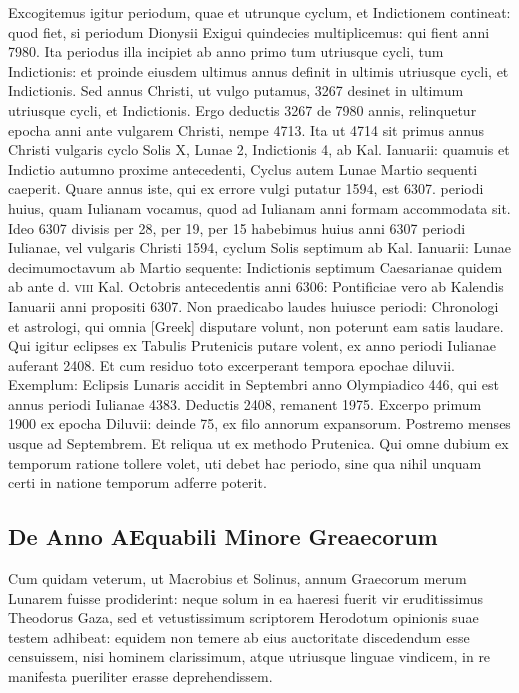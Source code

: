 Excogitemus igitur periodum,
quae et utrunque cyclum, et Indictionem contineat: quod fiet, si periodum
Dionysii Exigui quindecies multiplicemus: qui fient anni
7980.
Ita periodus illa incipiet ab anno primo tum utriusque cycli,
tum Indictionis: et proinde eiusdem ultimus annus definit in ultimis
utriusque cycli, et Indictionis.
Sed annus Christi, ut vulgo putamus,
3267 desinet in ultimum utriusque cycli, et Indictionis.
Ergo deductis
3267 de 7980 annis, relinquetur epocha anni ante vulgarem
Christi, nempe 4713.
Ita ut 4714 sit primus annus Christi vulgaris cyclo
Solis \textsc{X}, Lunae 2, Indictionis 4, ab Kal. Ianuarii: quamuis et Indictio
autumno proxime antecedenti, Cyclus autem Lunae Martio sequenti
caeperit.
Quare annus iste, qui ex errore vulgi putatur 1594, est 6307.
periodi huius, quam Iulianam vocamus, quod ad Iulianam anni formam
accommodata sit.
Ideo 6307 divisis per 28, per 19, per 15 habebimus
huius anni 6307 periodi Iulianae, vel vulgaris Christi 1594, cyclum
Solis septimum ab Kal. Ianuarii: Lunae decimumoctavum ab
Martio sequente: Indictionis septimum Caesarianae quidem ab ante d.
\textsc{viii} Kal. Octobris antecedentis anni 6306: Pontificiae vero ab
Kalendis Ianuarii anni propositi 6307.
Non praedicabo laudes huiusce periodi:
Chronologi et astrologi, qui omnia \textgreek{[Greek]} disputare volunt,
non poterunt eam satis laudare.
Qui igitur eclipses ex Tabulis
Prutenicis putare volent, ex anno periodi Iulianae auferant 2408.
Et
cum residuo toto excerperant tempora epochae diluvii.
Exemplum: Eclipsis
Lunaris accidit in Septembri anno Olympiadico 446, qui est annus
periodi Iulianae 4383.
Deductis 2408, remanent 1975.
Excerpo
primum 1900 ex epocha Diluvii: deinde 75, ex filo annorum expansorum.
Postremo menses usque ad Septembrem.
Et reliqua ut ex methodo
Prutenica.
Qui omne dubium ex temporum ratione tollere
volet, uti debet hac periodo, sine qua nihil unquam certi in natione
temporum adferre poterit.

\subsection{De Anno AEquabili Minore Greaecorum}
Cum quidam veterum, ut Macrobius et Solinus, annum Graecorum
merum Lunarem fuisse prodiderint: neque solum in ea
haeresi fuerit vir eruditissimus Theodorus Gaza, sed et vetustissimum
scriptorem Herodotum opinionis suae testem adhibeat: equidem non
temere ab eius auctoritate discedendum esse censuissem, nisi hominem
clarissimum, atque utriusque linguae vindicem, in re manifesta
pueriliter erasse deprehendissem.
